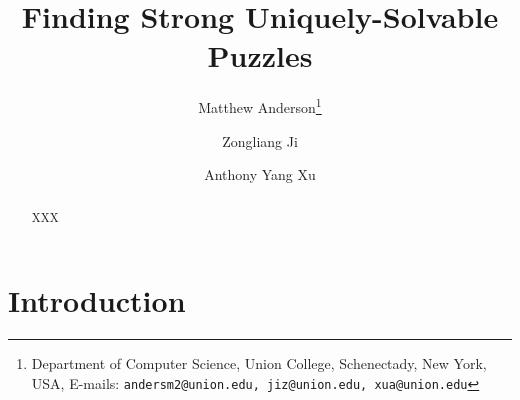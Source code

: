 \documentclass[11pt]{article}
\date{}
\title{Finding Strong Uniquely-Solvable Puzzles
{\IfFileExists{./sha.tex}{\\\small SHA: }{}}}
\author{
Matthew Anderson\thanks{Department of Computer Science, Union College, Schenectady, New York, USA, E-mails: \texttt{andersm2@union.edu, jiz@union.edu, xua@union.edu}}%
\and%
Zongliang Ji\samethanks[1]
\and%
Anthony Yang Xu\samethanks[1]
}
\begin{document}
\maketitle

\begin{abstract}
XXX
\end{abstract}

\thispagestyle{empty}
\newpage
{}


\section{Introduction}
\label{sec:intro}
\end{document}
